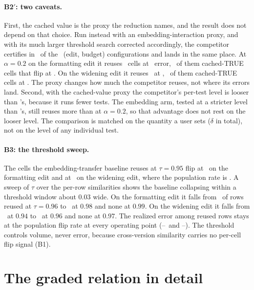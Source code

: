 \paragraph{B2$'$: two caveats.} First, the cached value is the proxy
the reduction names, and the result does not depend on that choice. Run
instead with an embedding-interaction proxy, and with its much larger
threshold search corrected accordingly, the competitor certifies in
\hhEmbCertCells\ of the \hhEmbCells\ (edit, budget) configurations and
lands in the same place. At $\alpha{=}0.2$ on the formatting edit it
reuses \hhEmbReused\ cells at \hhEmbErr\ error, \hhEmbTrueRows\ of them
cached-TRUE cells that flip at \hhEmbTrueErr. On the widening edit it
reuses \hhEmbReusedW\ at \hhEmbErrW, \hhEmbTrueRowsW\ of them
cached-TRUE cells at \hhEmbTrueErrW. The proxy changes how much the
competitor reuses, not where its errors land. Second, with the
cached-value proxy the competitor's per-test level is looser than
\sivm{}'s, because it runs fewer tests. The embedding arm, tested at a
stricter level than \sivm{}'s, still reuses more than \sivm{} at
$\alpha{=}0.2$, so that advantage does not rest on the looser level. The
comparison is matched on the quantity a user sets ($\delta$ in total),
not on the level of any individual test.

\keeprunin
\paragraph{B3: the threshold sweep.} The cells the embedding-transfer
baseline reuses at $\tau{=}0.95$ flip at \flipSoFormatting\ on the
formatting edit and at \bThreeErrW\ on the widening edit, where the
population rate is \flipSoWidening. A sweep of $\tau$ over the per-row
similarities shows the baseline collapsing within a threshold window
about $0.03$ wide. On the formatting edit it falls from \tauFmid\ of
rows reused at $\tau{=}0.96$ to \tauFhi\ at $0.98$ and none at $0.99$.
On the widening edit it falls from \tauWmid\ at $0.94$ to \tauWhi\ at
$0.96$ and none at $0.97$. The realized error among reused rows stays
at the population flip rate at every operating point
(\tauFerrLo--\tauFerrHi\ and \tauWerrLo--\tauWerrHi). The threshold
controls volume, never error, because cross-version similarity carries
no per-cell flip signal (B1).
\par

\FloatBarrier
\keepheading
\section{The graded relation in detail}
\label{app:graded}
\keeprunin
